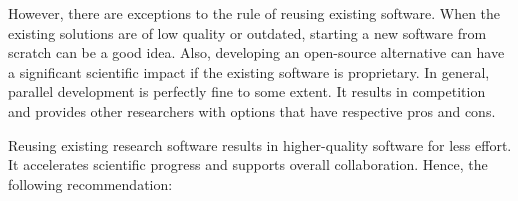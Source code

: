 \par 
However, there are exceptions to the rule of reusing existing software. When the existing solutions are of low quality or outdated, starting a new software from scratch can be a good idea. Also, developing an open-source alternative can have a significant scientific impact if the existing software is proprietary. 
In general, parallel development is perfectly fine to some extent. It results in competition and provides other researchers with options that have respective pros and cons.
\par 
Reusing existing research software results in higher-quality software for less effort. It accelerates scientific progress and supports overall collaboration. Hence, the following recommendation: 
